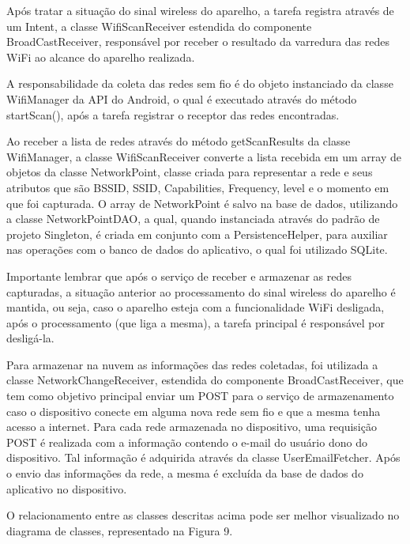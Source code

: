 \documentclass[12pt, %
openright, 
oneside,
a4paper,
brazil]{facom-ufu-abntex2}
\begin{document}
  Após tratar a situação do sinal wireless do aparelho, a tarefa registra através de um Intent, a classe WifiScanReceiver estendida do componente BroadCastReceiver, responsável por receber o resultado da varredura das redes \ac{WiFi} ao alcance do aparelho realizada.
 
 A responsabilidade da coleta das redes sem fio é do objeto instanciado da classe WifiManager da \ac{API} do Android, o qual é executado através do método startScan(), após a tarefa registrar o receptor das redes encontradas.
 
  Ao receber a lista de redes através do método getScanResults da classe WifiManager, a classe WifiScanReceiver converte a lista recebida em um array de objetos da classe NetworkPoint, classe criada para representar a rede e seus atributos que são \ac{BSSID}, \ac{SSID}, Capabilities, Frequency, level e o momento em que foi capturada. O array de NetworkPoint é salvo na base de dados, utilizando a classe NetworkPointDAO, a qual, quando instanciada através do padrão de projeto Singleton, é criada em conjunto com a PersistenceHelper, para auxiliar nas operações com o banco de dados do aplicativo, o qual foi utilizado SQLite.
 
 Importante lembrar que após o serviço de receber e armazenar as redes capturadas, a situação anterior ao processamento do sinal wireless do aparelho é mantida, ou seja, caso o aparelho esteja com a funcionalidade \ac{WiFi} desligada, após o processamento (que liga a mesma), a tarefa principal é responsável por desligá-la. 
 
  Para armazenar na nuvem as informações das redes coletadas, foi utilizada a classe NetworkChangeReceiver, estendida do componente BroadCastReceiver, que tem como objetivo principal enviar um POST para o serviço de armazenamento caso o dispositivo conecte em alguma nova rede sem fio e que a mesma tenha acesso a internet. Para cada rede armazenada no dispositivo, uma requisição POST é realizada com a informação contendo o e-mail do usuário dono do dispositivo. Tal informação é adquirida através da classe UserEmailFetcher. Após o envio das informações da rede, a mesma é excluída da base de dados do aplicativo no dispositivo.

  O relacionamento entre as classes descritas acima pode ser melhor visualizado no diagrama de classes, representado na Figura 9.    
  
\end{document}
